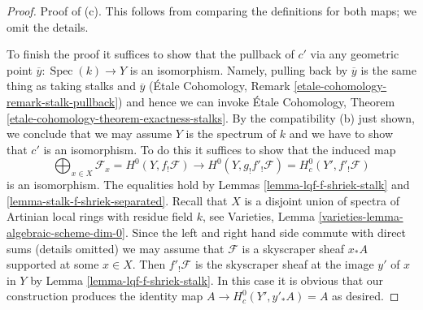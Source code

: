 \documentclass{stacks-project}
\theoremstyle{plain}
\theoremstyle{definition}
\theoremstyle{remark}
\numberwithin{equation}{subsection}
\def\Spec{\mathop{\mathrm{Spec}}}
\begin{document}
\begin{proof}
\medskip\noindent
Proof of (c). This follows from comparing the definitions
for both maps; we omit the details.

\medskip\noindent
To finish the proof it suffices to show that the pullback of
$c'$ via any geometric point $\overline{y} : \Spec(k) \to Y$
is an isomorphism. Namely, pulling back by $\overline{y}$
is the same thing as taking stalks and $\overline{y}$
(\'Etale Cohomology, Remark \ref{etale-cohomology-remark-stalk-pullback})
and hence we can invoke
\'Etale Cohomology, Theorem \ref{etale-cohomology-theorem-exactness-stalks}.
By the compatibility (b) just shown, we 
conclude that we may assume $Y$ is the spectrum of $k$
and we have to show that $c'$ is an isomorphism.
To do this it suffices to show that the induced map
$$
\bigoplus\nolimits_{x \in X} \mathcal{F}_x = H^0(Y, f_!\mathcal{F})
\longrightarrow
H^0(Y, g_!f'_!\mathcal{F}) = H^0_c(Y', f'_!\mathcal{F})
$$
is an isomorphism. The equalities hold by
Lemmas \ref{lemma-lqf-f-shriek-stalk} and
\ref{lemma-stalk-f-shriek-separated}.
Recall that $X$ is a disjoint union of
spectra of Artinian local rings with residue field $k$, see
Varieties, Lemma \ref{varieties-lemma-algebraic-scheme-dim-0}.
Since the left and right hand side commute with direct
sums (details omitted) we may assume that $\mathcal{F}$ is a skyscraper
sheaf $x_*A$ supported at some $x \in X$.
Then $f'_!\mathcal{F}$ is the skyscraper sheaf at the
image $y'$ of $x$ in $Y$ by Lemma \ref{lemma-lqf-f-shriek-stalk}.
In this case it is obvious that our construction
produces the identity map $A \to H^0_c(Y', y'_*A) = A$
as desired.
\end{proof}
\end{document}
